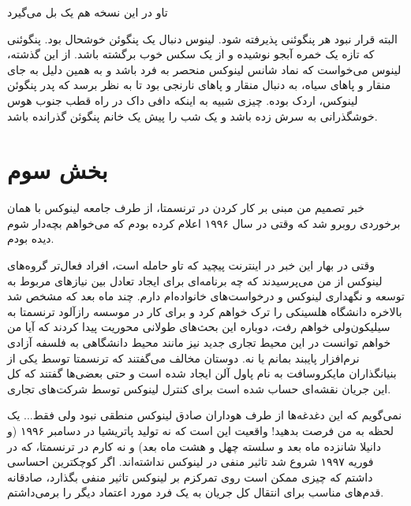 \begin{journal}
تاو در این نسخه هم یک بل می‌گیرد 


البته قرار نبود هر پنگوئنی پذیرفته شود. لینوس دنبال یک پنگوئن خوشحال
بود. پنگوئنی که تازه یک خمره آبجو نوشیده و از یک سکس خوب برگشته
باشد. از این گذشته، لینوس می‌خواست که نماد شانس لینوکس منحصر به فرد
باشد و به همین دلیل به جای منقار و پاهای سیاه، به دنبال منقار و پاهای
نارنجی بود تا به نظر برسد که پدر پنگوئن لینوکس، اردک بوده. چیزی شبیه
به اینکه دافی داک در راه قطب جنوب هوس خوشگذرانی به سرش زده باشد و یک
شب را پیش یک خانم پنگوئن گذرانده باشد.
\end{journal}

\section{بخش سوم}
خبر تصمیم من مبنی بر کار کردن در ترنسمتا، از طرف جامعه لینوکس با همان
برخوردی روبرو شد که وقتی در سال ۱۹۹۶ اعلام کرده بودم که می‌خواهم بچه‌دار
شوم دیده بودم.

وقتی در بهار این خبر در اینترنت پیچید که تاو حامله است، افراد فعال‌تر
گروه‌های لینوکس از من می‌پرسیدند که چه برنامه‌ای برای ایجاد تعادل بین
نیازهای مربوط به توسعه و نگهداری لینوکس و درخواست‌های خانواده‌ام
دارم. چند ماه بعد که مشخص شد بالاخره دانشگاه هلسینکی را ترک خواهم کرد
و برای کار در موسسه رازآلود ترنسمتا به سیلیکون‌ولی خواهم رفت، دوباره
این بحث‌های طولانی محوریت پیدا کردند که آیا من خواهم توانست در این محیط
تجاری جدید نیز مانند محیط دانشگاهی به فلسفه آزادی نرم‌افزار پایبند بمانم
یا نه. دوستان مخالف می‌گفتند که ترنسمتا توسط یکی از بنیانگذاران
مایکروسافت به نام پاول آلن ایجاد شده است و حتی
بعضی‌ها گفتند که کل این جریان نقشه‌ای حساب شده است برای کنترل لینوکس
توسط شرکت‌های تجاری.

نمی‌گویم که این دغدغه‌ها از طرف هوداران صادق لینوکس منطقی نبود ولی
فقط... یک لحظه به من فرصت بدهید! واقعیت این است که نه تولید پاتریشیا
در دسامبر ۱۹۹۶ (و دانیلا شانزده ماه بعد و سلسته چهل و هشت ماه بعد) و
نه کارم در ترنسمتا، که در فوریه ۱۹۹۷ شروع شد تاثیر منفی در لینوکس
نداشته‌اند. اگر کوچکترین احساسی داشتم که چیزی ممکن است روی تمرکزم بر
لینوکس تاثیر منفی بگذارد، صادقانه قدم‌های مناسب برای انتقال کل جریان به
یک فرد مورد اعتماد دیگر را برمی‌داشتم.

